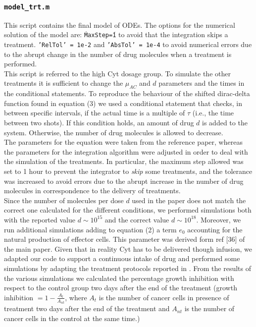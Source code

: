 \subsubsection{\texttt{model\_trt.m}}
This script contains the final model of ODEs. The options for the numerical solution of the model are: \texttt{\'MaxStep\'=1} to avoid that the integration skips a treatment. \texttt{'RelTol' = 1e-2} and \texttt{'AbsTol' = 1e-4} to avoid numerical errors due to the abrupt change in the number of drug molecules when a treatment is performed.\\
This script is referred to the high Cyt dosage group. To simulate the other treatments it is sufficient to change the $\mu_{AC}$ and $d$ parameters and the times in the conditional statements.
To reproduce the behaviour of the shifted dirac-delta function found in equation (3) we used a conditional statement that checks, in between specific intervals, if the actual time is a multiple of $\tau$ (i.e., the time between two shots). If this condition holds, an amount of drug $d$ is added to the system. Otherwise, the number of drug molecules is allowed to decrease.\\
The parameters for the equation were taken from the reference paper, whereas the parameters for the integration algorithm were adjusted in order to deal with the simulation of the treatments. In particular, the maximum step allowed was set to 1 hour to prevent the integrator to \textit{skip} some treatments, and the tolerance was increased to avoid errors due to the abrupt increase in the number of drug molecules in correspondence to the delivery of treatments.\\
Since the number of molecules per dose $d$ used in the paper does not match the correct one calculated for the different conditions, we performed simulations both with the reported value $d \sim 10^{15}$ and the correct value $d \sim 10^{18}$. Moreover, we run additional simulations adding to equation (2) a term $e_0$ accounting for the natural production of effector cells. This parameter was derived form ref [36] of the main paper.
Given that in reality Cyt has to be delivered though infusion, we adapted our code to support a continuous intake of drug and performed some simulations by adapting the treatment protocols reported in \cite{cyt-3}.
From the results of the various simulations we calculated the percentage growth inhibition with respect to the control group two days after the end of the treatment (growth inhibition $= 1 - \frac{A_t}{A_{nt}}$, where $A_t$ is the number of cancer cells in presence of treatment two days after the end of the treatment and $A_{nt}$ is the number of cancer cells in the control at the same time.)

